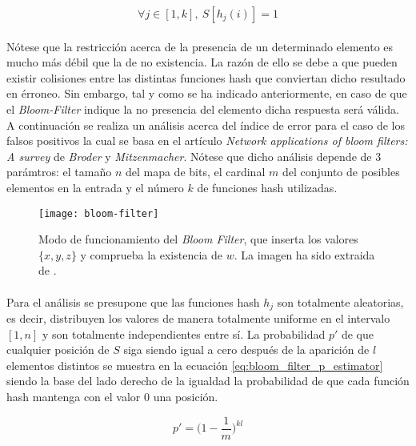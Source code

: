 \documentclass{subfiles}
\begin{document}
      \begin{equation}
      \label{eq:bloom_filter_update}
        \forall j \in [1,k], \ S[h_j(i)] = 1
      \end{equation}

      \paragraph{}
      Nótese que la restricción acerca de la presencia de un determinado elemento es mucho más débil que la de no existencia. La razón de ello se debe a que pueden existir colisiones entre las distintas funciones hash que conviertan dicho resultado en érroneo. Sin embargo, tal y como se ha indicado anteriormente, en caso de que el \emph{Bloom-Filter} indique la no presencia del elemento dicha respuesta será válida. A continuación se realiza un análisis acerca del índice de error para el caso de los falsos positivos la cual se basa en el artículo \emph{Network applications of bloom filters: A survey} \cite{broder2004network} de \emph{Broder} y \emph{Mitzenmacher}. Nótese que dicho análisis depende de 3 parámtros: el tamaño $n$ del mapa de bits, el cardinal $m$ del conjunto de posibles elementos en la entrada y el número $k$ de funciones hash utilizadas.

      \begin{figure}
        \centering
        \texttt{[image: bloom-filter]}
        \caption{Modo de funcionamiento del \emph{Bloom Filter}, que inserta los valores $\{ x, y, z\}$ y comprueba la existencia de $w$. La imagen ha sido extraida de \cite{wiki:Bloom_filter}.}
        \label{fig:bloom_filter}
      \end{figure}

      \paragraph{}
      Para el análisis se presupone que las funciones hash $h_j$ son totalmente aleatorias, es decir, distribuyen los valores de manera totalmente uniforme en el intervalo $[1,n]$ y son totalmente independientes entre sí. La probabilidad $p'$ de que cualquier posición de $S$ siga siendo igual a cero después de la aparición de $l$ elementos distintos se muestra en la ecuación \eqref{eq:bloom_filter_p_estimator} siendo la base del lado derecho de la igualdad la probabilidad de que cada función hash mantenga con el valor $0$ una posición.

      \begin{equation}
      \label{eq:bloom_filter_p_estimator}
       p' = \bigg(1-\frac{1}{m}\bigg)^{kl}
      \end{equation}
\end{document}
